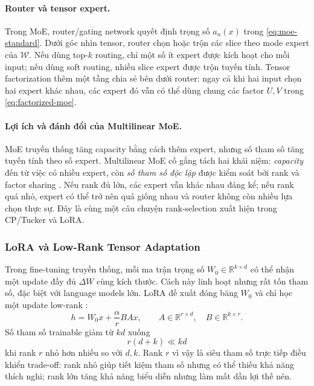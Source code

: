 \paragraph{Router và tensor expert.}
Trong MoE, router/gating network quyết định trọng số $a_n(x)$ trong
\eqref{eq:moe-standard}. Dưới góc nhìn tensor, router chọn hoặc trộn các slice theo
mode expert của $\mathcal{W}$. Nếu dùng top-$k$ routing, chỉ một số ít expert được kích
hoạt cho mỗi input; nếu dùng soft routing, nhiều slice expert được trộn tuyến tính.
Tensor factorization thêm một tầng chia sẻ bên dưới router: ngay cả khi hai input chọn
hai expert khác nhau, các expert đó vẫn có thể dùng chung các factor $U,V$ trong
\eqref{eq:factorized-moe}.

\paragraph{Lợi ích và đánh đổi của Multilinear MoE.}
MoE truyền thống tăng capacity bằng cách thêm expert, nhưng số tham số tăng tuyến tính
theo số expert. Multilinear MoE cố gắng tách hai khái niệm: \emph{capacity} đến từ việc
có nhiều expert, còn \emph{số tham số độc lập} được kiểm soát bởi rank và factor sharing
\cite{oldfield2024multilinear}. Nếu rank đủ lớn, các expert vẫn khác nhau đáng kể; nếu
rank quá nhỏ, expert có thể trở nên quá giống nhau và router không còn nhiều lựa chọn
thực sự. Đây là cùng một câu chuyện rank-selection xuất hiện trong CP/Tucker và LoRA.

\subsubsection{LoRA và Low-Rank Tensor Adaptation}

Trong fine-tuning truyền thống, mỗi ma trận trọng số
$W_0 \in \mathbb{R}^{k \times d}$ có thể nhận một update đầy đủ $\Delta W$ cùng kích
thước. Cách này linh hoạt nhưng rất tốn tham số, đặc biệt với language models lớn.
LoRA đề xuất đóng băng $W_0$ và chỉ học một update low-rank \cite{hu2022lora}:
\begin{equation}
    h = W_0x + \frac{\alpha}{r}BAx,
    \qquad
    A \in \mathbb{R}^{r \times d},\quad
    B \in \mathbb{R}^{k \times r}.
    \label{eq:lora}
\end{equation}
Số tham số trainable giảm từ $kd$ xuống
\begin{equation}
    r(d+k) \ll kd
    \label{eq:lora-params}
\end{equation}
khi rank $r$ nhỏ hơn nhiều so với $d,k$. Rank $r$ vì vậy là siêu tham số trực tiếp điều
khiển trade-off: rank nhỏ giúp tiết kiệm tham số nhưng có thể thiếu khả năng thích nghi;
rank lớn tăng khả năng biểu diễn nhưng làm mất dần lợi thế nén.


